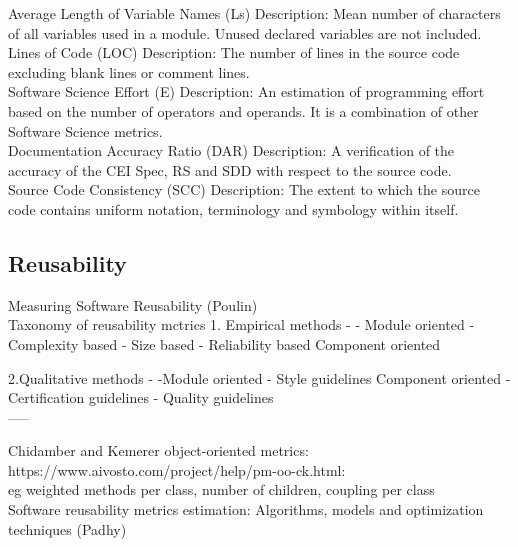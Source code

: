 \documentclass{article}
\begin{document}
 Average Length of Variable Names (Ls) Description:     Mean  number  of  characters  of  all  variables  used  in  a  module.    Unused  declared  variables are not included. \\
 
  Lines of  Code (LOC) Description: The number of lines in the source code excluding blank lines or comment lines.\\
  
  Software Science Effort (E) Description:    An  estimation  of  programming  effort  based  on  the  number  of  operators  and  operands.  It is a combination of other Software Science metrics.\\
  
  Documentation Accuracy Ratio (DAR) Description:     A  verification  of  the  accuracy  of  the  CEI Spec, RS and SDD with respect to the source code.\\
  
  Source Code Consistency (SCC) Description:     The  extent  to  which  the  source  code  contains uniform notation, terminology and symbology within itself. \\
  
  



\subsection{Reusability}
Measuring Software Reusability (Poulin)\\  

Taxonomy of reusability mctrics
1. Empirical methods
-
-
Module oriented
- Complexity based
- Size based
- Reliability based
Component oriented

 2.Qualitative methods
-
-Module oriented
- Style guidelines
Component oriented
- Certification guidelines
- Quality guidelines\\



-----

Chidamber and Kemerer object-oriented metrics:\\ 

https://www.aivosto.com/project/help/pm-oo-ck.html:\\ 

eg weighted methods per class, number of children, coupling per class\\ 

Software reusability metrics estimation: Algorithms, models and optimization techniques (Padhy)\\ 
\end{document}
